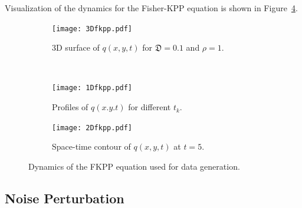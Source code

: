 Visualization of the dynamics for the Fisher-KPP equation is shown in Figure~\ref{fig:fisher-data}.

\begin{figure}[h!]
    \hspace{-0.8cm}
  \centering
  \begin{subfigure}[t]{\textwidth}
    \centering
    \texttt{[image: 3Dfkpp.pdf]}
    \caption{3D surface of $q(x,y,t)$ for $\mathfrak{D}=0.1$ and $\rho=1$.}
    \label{fig:fisher-init}
  \end{subfigure}
  \\[1em]
  \begin{subfigure}[t]{0.48\textwidth}
    \centering
    \texttt{[image: 1Dfkpp.pdf]}
    \caption{Profiles of $q(x.y.t)$ for different $t_k$.}
    \label{fig:fisher-mid}
  \end{subfigure}
  \hfill
  \begin{subfigure}[t]{0.48\textwidth}
    \centering
    \texttt{[image: 2Dfkpp.pdf]}
    \caption{Space-time contour of $q(x,y,t)$ at $t=5$.}
    \label{fig:fisher-final}
  \end{subfigure}
  \caption{Dynamics of the FKPP equation used for data generation.}
  \label{fig:fisher-data}
\end{figure}     

\newpage


\subsection*{Noise Perturbation}

\vspace{1.0cm}

